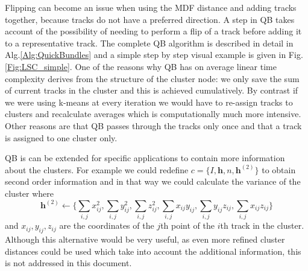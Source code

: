 \documentclass[preprint,authoryear,a4paper,10pt,onecolumn]{elsarticle}
\begin{document}
Flipping can become an issue when using the MDF distance and adding
tracks together, because tracks do not have a preferred direction.
A step in QB takes account of the possibility of needing to perform
a flip of a track before adding it to a representative track. The
complete QB algorithm is described in detail in Alg.\ref{Alg:QuickBundles}
and a simple step by step visual example is given in Fig.\ref{Fig:LSC_simple}.
One of the reasons why QB has on average linear time complexity derives
from the structure of the cluster node: we only save the sum of current
tracks in the cluster and this is achieved cumulatively. By contrast
if we were using k-means at every iteration we would have to re-assign
tracks to clusters and recalculate averages which is computationally
much more intensive. Other reasons are that QB passes through the
tracks only once and that a track is assigned to one cluster only. 

QB is can be extended for specific applications to contain more information
about the clusters. For example we could redefine $c=\{I,\mathbf{h},n,\mathbf{h}^{(2)}\}$
to obtain second order information and in that way we could calculate
the variance of the cluster where \[
\mathbf{h}^{(2)}\leftarrow\{\sum_{i,j}x_{ij}^{2},\sum_{i,j}y_{ij}^{2},\sum_{i,j}z_{ij}^{2},\sum_{i,j}x_{ij}y_{ij},\sum_{i,j}y_{ij}z_{ij},\sum_{i,j}x_{ij}z_{ij}\}\]
 and $x_{ij},y_{ij},z_{ij}$ are the coordinates of the $j$th point
of the $i$th track in the cluster. Although this alternative would
be very useful, as even more refined cluster distances could be used
which take into account the additional information, this is not addressed
in this document.
\end{document}
